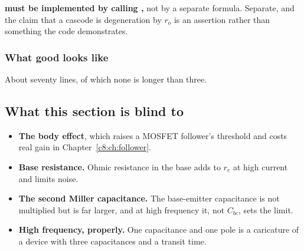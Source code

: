 \textbf{ must be implemented by calling ,} not by a separate formula. Separate, and the claim that a cascode is degeneration by $r_o$ is an assertion rather than something the code demonstrates.

\subsubsection{What good looks like}
About seventy lines, of which none is longer than three.

\subsection{What this section is blind to}
\label{c7:sec:b8}
\begin{itemize}
  \item \textbf{The body effect}, which raises a MOSFET follower's threshold and costs real gain in Chapter~\ref{c8:ch:follower}.
  \item \textbf{Base resistance.} Ohmic resistance in the base adds to $r_e$ at high current and limits noise.
  \item \textbf{The second Miller capacitance.} The base-emitter capacitance is not multiplied but is far larger, and at high frequency it, not $C_{bc}$, sets the limit.
  \item \textbf{High frequency, properly.} One capacitance and one pole is a caricature of a device with three capacitances and a transit time.
\end{itemize}
